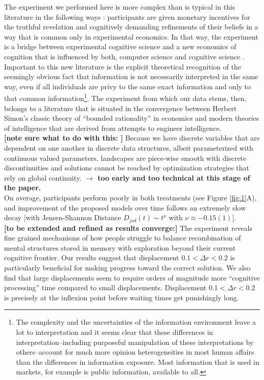 The experiment we performed here is more complex than is typical in this literature in the following ways : participants are given monetary incentives for the truthful revelation and cognitively demanding refinements of their beliefs in a way that is common only in experimental economics.  In that way, the experiment is a bridge between experimental cognitive science and a new economics of cognition that is influenced by both, computer science and cognitive science \cite{Spiegler2016}. Important to this new literature is the explicit theoretical recognition of the seemingly obvious fact that information is not necessarily interpreted in the same way, even if all individuals are privy to the same exact information and only to that common information\footnote{The complexity and the uncertainties of the information environment leave a lot to interpretation and it seems clear that these differences in interpretation--including purposeful manipulation of these interpretations by others--account for much more opinion heterogeneities in most human affairs than the differences in information exposure.  Most information that is used in markets, for example is public information, available to all.}. The experiment from which our data stems, then, belongs to a literature that is situated in the convergence between Herbert Simon's classic theory of ``bounded rationality'' in economics \cite{Gigerenzer2001, Rubinstein98, tsang2008computational, simon1955behavioral} and modern theories of intelligence that are derived from attempts to engineer intelligence.\\  


{\bf [note sure what to do with this: ]} Because we have discrete variables that are dependent on one another in discrete data structures, albeit parameterized with continuous valued parameters, landscapes are piece-wise smooth with discrete discontinuities and solutions cannot be reached by optimization strategies that rely on global continuity. {\bf $\rightarrow$ too early and too technical at this stage of the paper.} \\

On average, participants perform poorly in both treatments (see Figure \ref{fig:1}A), and improvement of the proposed models over time follows an extremely slow decay [with Jensen-Shannon Distance $D_{jsd}(t) \sim t^{\nu}$ with $ \nu \approx -0.15(1)$]. \\

{\bf [to be extended and refined as results converge:]} The experiment reveals fine grained mechanisms of how people struggle to balance recombination of mental structures stored in memory with exploration beyond their current cognitive frontier.  Our results suggest that displacement $0.1 < \Delta r < 0.2 $ is particularly beneficial for making progress toward the correct solution. We also find that large displacements seem to require orders of magnitude more ``cognitive processing'' time compared to small displacements. Displacement $0.1 < \Delta r < 0.2 $ is precisely at the inflexion point before waiting times get punishingly long.\\

